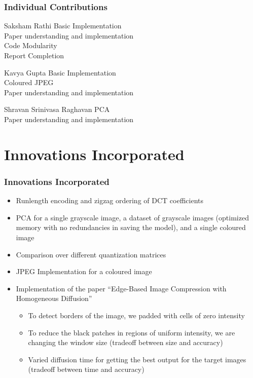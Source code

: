\documentclass[Serif, 10pt, brown]{beamer}
\theoremstyle{example}
\theoremstyle{plain}
\begin{document}
\begin{frame}
	\frametitle{Individual Contributions}
	\begin{alertblock}{Saksham Rathi}
		Basic Implementation\\
		Paper understanding and implementation\\
		Code Modularity\\
		Report Completion
	\end{alertblock}
	\begin{alertblock}{Kavya Gupta}
		Basic Implementation\\
		Coloured JPEG\\
		Paper understanding and implementation
	\end{alertblock}
	\begin{alertblock}{Shravan Srinivasa Raghavan}
		PCA\\
		Paper understanding and implementation
	\end{alertblock}

\end{frame}

\section{Innovations Incorporated}

\begin{frame}
	\frametitle{Innovations Incorporated}
	\begin{itemize}
		\item Runlength encoding and zigzag ordering of DCT coefficients
		\item PCA for a single grayscale image, a dataset of grayscale images (optimized memory with no redundancies in saving the model), and a single coloured image
		\item Comparison over different quantization matrices
		\item JPEG Implementation for a coloured image
		\item Implementation of the paper ``Edge-Based Image Compression with Homogeneous Diffusion''
		\begin{itemize}
			\item To detect borders of the image, we padded with cells of zero intensity
			\item To reduce the black patches in regions of uniform intensity, we are changing the window size (tradeoff between size and accuracy)
			\item Varied diffusion time for getting the best output for the target images (tradeoff between time and accuracy)
		\end{itemize}
	\end{itemize}
\end{frame}
\end{document}
